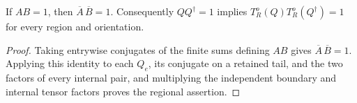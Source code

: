 \begin{lemma}%
    \label{thm:peps_oriented_coordinate_inverse}
    \leanok
    If $AB=1$, then $\overline A\,\overline B=1$.
    Consequently $QQ^\dagger=1$ implies
    $T_R^o(Q)T_R^o(Q^\dagger)=1$ for every region and orientation.
\end{lemma}
\begin{proof}\leanok
    Taking entrywise conjugates of the finite sums defining $AB$ gives $\overline A\,\overline B=1$.
    Applying this identity to each $Q_e$, its conjugate on a
    retained tail, and the two factors of every internal pair, and
    multiplying the independent boundary and internal tensor
    factors proves the regional assertion.
\end{proof}

